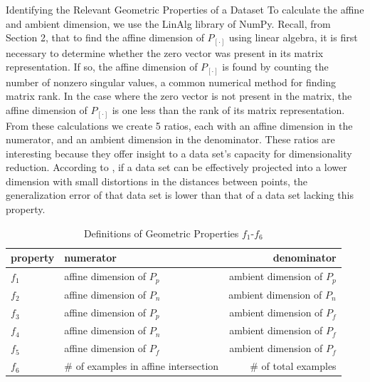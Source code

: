 \documentclass{llncs}
\begin{document}
\begin{section}{Identifying the Relevant Geometric Properties of a Dataset}
To calculate the affine and ambient dimension, we use the LinAlg library of NumPy\cite{numpy}. Recall, from Section 2, that to find the affine dimension of $P_{[\cdot]}$ using linear algebra, it is first necessary to determine whether the zero vector was present in its matrix representation. If so, the affine dimension of $P_{[\cdot]}$ is found by counting the number of nonzero singular values, a common numerical method for finding matrix rank\cite{numR}. In the case where the zero vector is not present in the matrix, the affine dimension of $P_{[\cdot]}$ is one less than the rank of its matrix representation. From these calculations we create 5 ratios, each with an affine dimension in the numerator, and an ambient dimension in the denominator. These ratios are interesting because they offer insight to a data set's capacity for dimensionality reduction. According to \cite{Bradley}\cite{Garg}, if a data set can be effectively projected into a lower dimension with small distortions in the distances between points, the generalization error of that data set is lower than that of a data set lacking this property. 
\begin{table}[ht]
\centering
\caption{Definitions of Geometric Properties $f_1$-$f_6$}
\begin{tabular}{l l r }
\hline \hline
property&numerator&denominator \\
\hline

$f_1$&affine dimension of $P_p$& ambient dimension of $P_p$\\
$f_2$&affine dimension of $P_n$& ambient dimension of $P_n$\\
$f_3$&affine dimension of $P_p$& ambient dimension of $P_f$\\
$f_4$&affine dimension of $P_n$& ambient dimension of $P_f$\\
$f_5$&affine dimension of $P_f$& ambient dimension of $P_f$\\
$f_6$&\# of examples in affine intersection   &\# of total examples\\
\hline
\end{tabular}
\label{tab:formulas}
\end{table}



\end{section}
\end{document}

